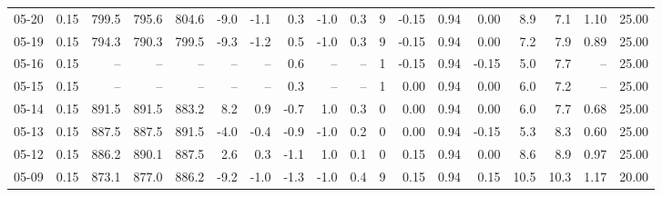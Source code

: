 \begin{threeparttable}
{\begin{tabular}{lrrrrrrrrrrrrrrrrr}
  05-20 &     0.15 & 799.5 & 795.6 & 804.6 &       -9.0 &           -1.1 &                       0.3 &                     -1.0 &                 0.3 &              9 &      -0.15 &      0.94 &           0.00 &              8.9 &                 7.1 &            1.10 &                  25.00 \\
  05-19 &     0.15 & 794.3 & 790.3 & 799.5 &       -9.3 &           -1.2 &                       0.5 &                     -1.0 &                 0.3 &              9 &      -0.15 &      0.94 &           0.00 &              7.2 &                 7.9 &            0.89 &                  25.00 \\
  05-16 &     0.15 &    -- &    -- &    -- &         -- &             -- &                       0.6 &                       -- &                  -- &              1 &      -0.15 &      0.94 &          -0.15 &              5.0 &                 7.7 &              -- &                  25.00 \\
  05-15 &     0.15 &    -- &    -- &    -- &         -- &             -- &                       0.3 &                       -- &                  -- &              1 &       0.00 &      0.94 &           0.00 &              6.0 &                 7.2 &              -- &                  25.00 \\
  05-14 &     0.15 & 891.5 & 891.5 & 883.2 &        8.2 &            0.9 &                      -0.7 &                      1.0 &                 0.3 &              0 &       0.00 &      0.94 &           0.00 &              6.0 &                 7.7 &            0.68 &                  25.00 \\
  05-13 &     0.15 & 887.5 & 887.5 & 891.5 &       -4.0 &           -0.4 &                      -0.9 &                     -1.0 &                 0.2 &              0 &       0.00 &      0.94 &          -0.15 &              5.3 &                 8.3 &            0.60 &                  25.00 \\
  05-12 &     0.15 & 886.2 & 890.1 & 887.5 &        2.6 &            0.3 &                      -1.1 &                      1.0 &                 0.1 &              0 &       0.15 &      0.94 &           0.00 &              8.6 &                 8.9 &            0.97 &                  25.00 \\
  05-09 &     0.15 & 873.1 & 877.0 & 886.2 &       -9.2 &           -1.0 &                      -1.3 &                     -1.0 &                 0.4 &              9 &       0.15 &      0.94 &           0.15 &             10.5 &                10.3 &            1.17 &                  20.00 \\

\end{tabular}}
\end{threeparttable}

